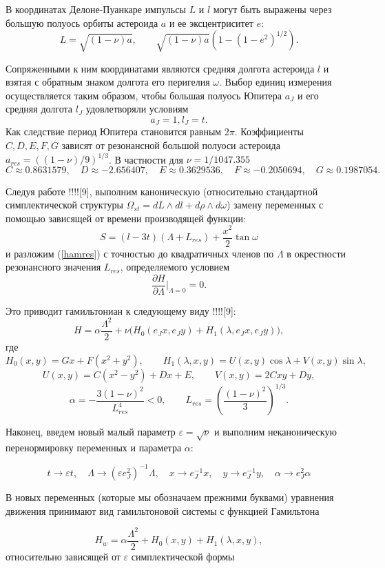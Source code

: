 В координатах Делоне-Пуанкаре импульсы $L$ и $l$ могут быть выражены через большую полуось орбиты астероида $a$ и ее эксцентриситет $e$:
$$L = \sqrt{(1-\nu)a}, \qquad \sqrt{(1-\nu)a} (1-(1-e^2)^{1/2}).$$

Сопряженными к ним координатами являются средняя долгота астероида $l$ и взятая с обратным знаком долгота его перигелия $\omega$. Выбор единиц измерения осуществляется таким образом, чтобы большая полуось Юпитера $a_J$ и его средняя долгота $l_J$ удовлетворяли условиям 
$$a_J=1, l_J= t .$$
Как следствие период Юпитера становится равным $2\pi$.
Коэффициенты $C,D,E,F,G$ зависят от резонансной большой полуоси астероида $a_{res} = ((1-\nu)/9)^{1/3}$. В частности для $\nu = 1/1047.355$
$$C \approx 0.8631579, \quad D \approx -2.656407, \quad E \approx 0.3629536, \quad F \approx -0.2050694, \quad G \approx 0.1987054.$$

Следуя работе !!!![9], выполним каноническую (относительно стандартной симплектической структуры $\Omega_{st}=dL \wedge dl+d \rho \wedge d \omega$) замену переменных с помощью зависящей от времени производящей функции:
$$S=(l-3t)(\Lambda+L_{res})+\frac{x^2}2 \tan \omega$$
и разложим (\ref{hamres}) с точностью до квадратичных членов по $\Lambda$ в окрестности резонансного значения $L_{res}$, определяемого условием
$$\frac{\partial H}{\partial \Lambda}\bigg|_{\Lambda=0} = 0.$$

Это приводит гамильтониан к следующему виду !!!![9]:
$$H = \alpha \frac{\Lambda^2}{2} + \nu \big( H_0(e_Jx, e_Jy) + H_1(\lambda, e_Jx, e_J y) \big),$$
где
$$H_0(x,y) = Gx +F(x^2+y^2), \qquad H_1(\lambda,x,y) = U(x,y) \cos \lambda + V(x,y) \sin \lambda,$$
$$U(x,y) = C(x^2-y^2) + Dx + E, \qquad V(x,y) = 2Cxy + Dy,$$
$$\alpha = - \frac{3 (1-\nu)^2}{L_{res}^4} < 0, \qquad L_{res} = \left( \frac{(1-\nu)^2}{3} \right)^{1/3}.$$


Наконец, введем новый малый параметр $ \varepsilon = \sqrt{\nu} $ и выполним неканоническую перенормировку переменных и параметра $ \alpha $:

$$t \rightarrow \varepsilon t,\quad \Lambda \rightarrow (\varepsilon e_J^2)^{-1} \Lambda,\quad x \rightarrow e_J^{-1} x,\quad y \rightarrow e_J^{-1} y,\quad \alpha \rightarrow e_J^2 \alpha$$

В новых переменных (которые мы обозначаем прежними буквами) уравнения движения принимают вид гамильтоновой системы с функцией Гамильтона

\begin{equation}
    H_w = \alpha \frac{\Lambda^2}{2} + H_0(x, y) + H_1(\lambda, x, y),
    \label{hw}
\end{equation}
относительно зависящей от $ \varepsilon $ симплектической формы

